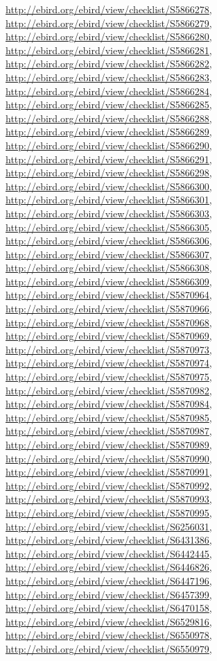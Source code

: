 \documentclass[9pt, article]{memoir}
\begin{document}
\begin{multicols}{2}
\url{http://ebird.org/ebird/view/checklist/S5866278}, 
\url{http://ebird.org/ebird/view/checklist/S5866279}, 
\url{http://ebird.org/ebird/view/checklist/S5866280}, 
\url{http://ebird.org/ebird/view/checklist/S5866281}, 
\url{http://ebird.org/ebird/view/checklist/S5866282}, 
\url{http://ebird.org/ebird/view/checklist/S5866283}, 
\url{http://ebird.org/ebird/view/checklist/S5866284}, 
\url{http://ebird.org/ebird/view/checklist/S5866285}, 
\url{http://ebird.org/ebird/view/checklist/S5866288}, 
\url{http://ebird.org/ebird/view/checklist/S5866289}, 
\url{http://ebird.org/ebird/view/checklist/S5866290}, 
\url{http://ebird.org/ebird/view/checklist/S5866291}, 
\url{http://ebird.org/ebird/view/checklist/S5866298}, 
\url{http://ebird.org/ebird/view/checklist/S5866300}, 
\url{http://ebird.org/ebird/view/checklist/S5866301}, 
\url{http://ebird.org/ebird/view/checklist/S5866303}, 
\url{http://ebird.org/ebird/view/checklist/S5866305}, 
\url{http://ebird.org/ebird/view/checklist/S5866306}, 
\url{http://ebird.org/ebird/view/checklist/S5866307}, 
\url{http://ebird.org/ebird/view/checklist/S5866308}, 
\url{http://ebird.org/ebird/view/checklist/S5866309}, 
\url{http://ebird.org/ebird/view/checklist/S5870964}, 
\url{http://ebird.org/ebird/view/checklist/S5870966}, 
\url{http://ebird.org/ebird/view/checklist/S5870968}, 
\url{http://ebird.org/ebird/view/checklist/S5870969}, 
\url{http://ebird.org/ebird/view/checklist/S5870973}, 
\url{http://ebird.org/ebird/view/checklist/S5870974}, 
\url{http://ebird.org/ebird/view/checklist/S5870975}, 
\url{http://ebird.org/ebird/view/checklist/S5870982}, 
\url{http://ebird.org/ebird/view/checklist/S5870984}, 
\url{http://ebird.org/ebird/view/checklist/S5870985}, 
\url{http://ebird.org/ebird/view/checklist/S5870987}, 
\url{http://ebird.org/ebird/view/checklist/S5870989}, 
\url{http://ebird.org/ebird/view/checklist/S5870990}, 
\url{http://ebird.org/ebird/view/checklist/S5870991}, 
\url{http://ebird.org/ebird/view/checklist/S5870992}, 
\url{http://ebird.org/ebird/view/checklist/S5870993}, 
\url{http://ebird.org/ebird/view/checklist/S5870995}, 
\url{http://ebird.org/ebird/view/checklist/S6256031}, 
\url{http://ebird.org/ebird/view/checklist/S6431386}, 
\url{http://ebird.org/ebird/view/checklist/S6442445}, 
\url{http://ebird.org/ebird/view/checklist/S6446826}, 
\url{http://ebird.org/ebird/view/checklist/S6447196}, 
\url{http://ebird.org/ebird/view/checklist/S6457399}, 
\url{http://ebird.org/ebird/view/checklist/S6470158}, 
\url{http://ebird.org/ebird/view/checklist/S6529816}, 
\url{http://ebird.org/ebird/view/checklist/S6550978}, 
\url{http://ebird.org/ebird/view/checklist/S6550979}, 

\end{multicols}
\end{document}

